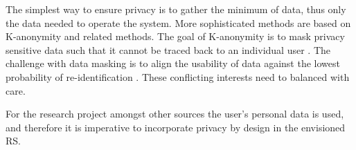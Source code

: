 The simplest way to ensure privacy is to gather the minimum of data, thus only the data needed to operate the system. 
More sophisticated methods are based on K-anonymity and related methods. The goal of K-anonymity is to mask privacy sensitive data such that it cannot be traced back to an individual user \cite{sweeney2002k}. 
The challenge with data masking is to align the usability of data against the lowest probability of re-identification \cite{d2015privacy}. 
These conflicting interests need to balanced with care.

For the research project amongst other sources the user's personal data is used, and therefore it is imperative to incorporate privacy by design in the envisioned RS. 


